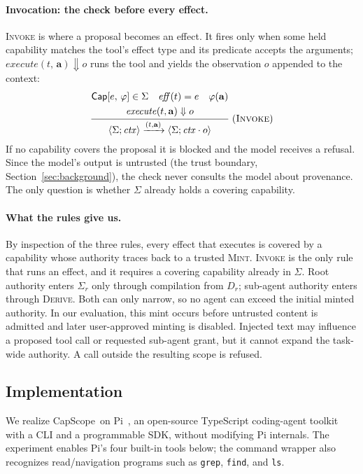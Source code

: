 \documentclass[sigplan,review,anonymous]{acmart}
\newcommand{\tool}{CapScope\xspace}
\renewcommand{\Cap}[2]{\textsf{Cap}[{#1},\,{#2}]}
\newcommand{\rulename}[1]{\textsc{#1}}
\begin{document}
  \paragraph{Invocation: the check before every effect.}
  \rulename{Invoke} is where a proposal becomes an effect. It fires only when
  some held capability matches the tool's effect type and its predicate
  accepts the arguments; $\mathit{execute}(t,\,\mathbf{a}) \Downarrow o$ runs
  the tool and yields the observation $o$ appended to the context:
  {\small\[
    \frac{
      \begin{gathered}
      \Cap{e}{\varphi}\in\Sigma \quad \mathit{eff}(t)=e \quad
      \varphi(\mathbf a) \\
      \mathit{execute}(t,\mathbf a)\Downarrow o
      \end{gathered}
    }{
      \langle\Sigma;\mathit{ctx}\rangle
      \xrightarrow{(t,\mathbf a)}
      \langle\Sigma;\mathit{ctx}\cdot o\rangle
    }\; (\rulename{Invoke})
  \]}
  If no capability covers the proposal it is blocked and the model receives a
  refusal. Since the model's output is untrusted (the trust boundary, Section~\ref{sec:background}),
  the check never consults the model about provenance. The only question is
  whether $\Sigma$ already holds a covering capability.



  \paragraph{What the rules give us.}
  By inspection of the three rules, every effect that executes is covered by a
  capability whose authority traces back to a trusted \rulename{Mint}.
  \rulename{Invoke} is the only rule that runs an effect, and it requires a
  covering capability already in $\Sigma$. Root authority enters $\Sigma_r$ only
  through compilation from $D_r$; sub-agent authority enters through
  \rulename{Derive}. Both can only narrow, so no agent can exceed the initial
  minted authority. In our
  evaluation, this mint occurs before untrusted content is admitted and later
  user-approved minting is disabled. Injected text may influence a proposed
  tool call or requested sub-agent grant, but it cannot expand the task-wide
  authority. A call outside the resulting scope is refused.

  \subsection{Implementation}
  \label{sec:pattern}
  We realize \tool\ on Pi~\cite{pi2025}, an open-source TypeScript coding-agent
  toolkit with a CLI and a programmable SDK, without modifying Pi internals.
  The experiment enables Pi's four built-in tools below; the command wrapper
  also recognizes read/navigation programs such as \texttt{grep}, \texttt{find},
  and \texttt{ls}.
\end{document}
